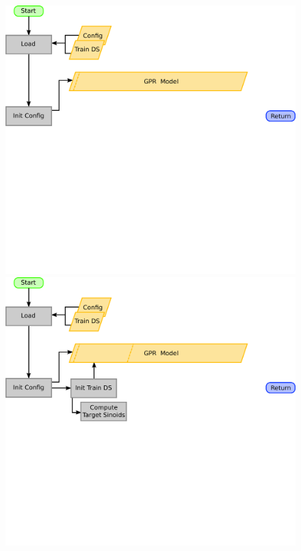 \documentclass{beamer}
\begin{document}
\begin{frame}
\begin{columns}[c]
\begin{figure}
\begin{overprint}
			\includegraphics[width=\linewidth]{images/GPR_Initialization-2}
			\onslide<3>\includegraphics[width=\linewidth]{images/GPR_Initialization-3}

\end{overprint}
\end{figure}
\end{columns}
\end{frame}
\end{document}
